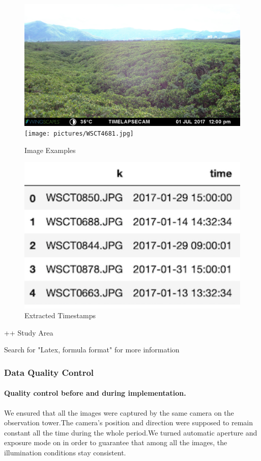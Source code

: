 \documentclass{article}
\begin{document}
\begin{figure}
  \centering
  \includegraphics[width=1\textwidth]{pictures/WSCT4349.jpg}
  \texttt{[image: pictures/WSCT4681.jpg]}
  \caption{Image Examples}
  \label{fig:fig1}
  \includegraphics[width=1\textwidth]{pictures/time.png}
  \caption{Extracted Timestamps}
\end{figure}
++ Study Area


Search for "Latex, formula format" for more information

\subsubsection{Data Quality Control}
\paragraph{Quality control before and during implementation.}
We ensured that all the images were captured by the same camera on the observation tower.The camera's position and direction were supposed to remain constant all the time during the whole period.We turned automatic aperture and exposure mode on in order to guarantee that among all the images, the illumination conditions stay consistent.
\end{document}
